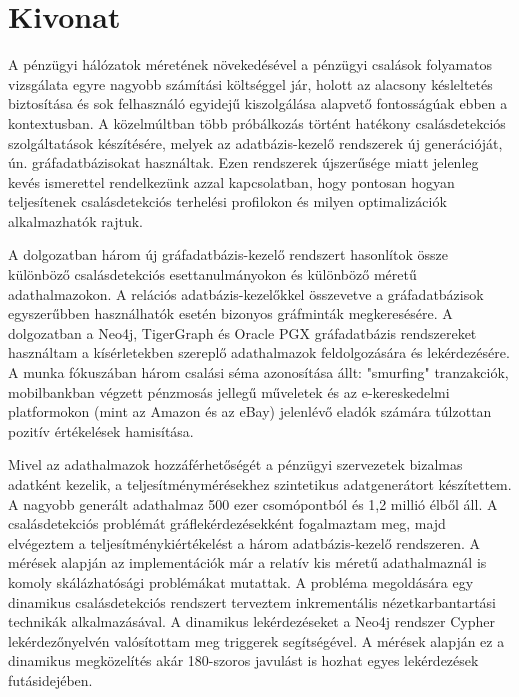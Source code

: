 \setcounter{page}{1}

\selecthungarian

\chapter*{Kivonat}

A pénzügyi hálózatok méretének növekedésével a pénzügyi csalások folyamatos vizsgálata egyre nagyobb számítási költséggel jár, holott az alacsony késleltetés biztosítása és sok felhasználó egyidejű kiszolgálása alapvető fontosságúak ebben a kontextusban.
A közelmúltban több próbálkozás történt hatékony csalásdetekciós szolgáltatások készítésére, melyek az adatbázis-kezelő rendszerek új generációját, ún. gráfadatbázisokat használtak.
Ezen rendszerek újszerűsége miatt jelenleg kevés ismerettel rendelkezünk azzal kapcsolatban, hogy pontosan hogyan teljesítenek csalásdetekciós terhelési profilokon és milyen optimalizációk alkalmazhatók rajtuk.

A dolgozatban három új gráfadatbázis-kezelő rendszert hasonlítok össze különböző csalásdetekciós esettanulmányokon és különböző méretű adathalmazokon.
A relációs adatbázis-kezelőkkel összevetve a gráfadatbázisok egyszerűbben használhatók esetén bizonyos gráfminták megkeresésére.
A dolgozatban a Neo4j, TigerGraph és Oracle PGX gráfadatbázis rendszereket használtam a kísérletekben szereplő adathalmazok feldolgozására és lekérdezésére.
A munka fókuszában három csalási séma azonosítása állt:
"smurfing" tranzakciók,
mobilbankban végzett pénzmosás jellegű műveletek és
az e-kereskedelmi platformokon (mint az Amazon és az eBay) jelenlévő eladók számára túlzottan pozitív értékelések hamisítása.

Mivel az adathalmazok hozzáférhetőségét a pénzügyi szervezetek bizalmas adatként kezelik, a teljesítménymérésekhez szintetikus adatgenerátort készítettem.
A nagyobb generált adathalmaz 500 ezer csomópontból és 1,2 millió élből áll.
A csalásdetekciós problémát gráflekérdezésekként fogalmaztam meg, majd elvégeztem a teljesítménykiértékelést a három adatbázis-kezelő rendszeren. A mérések alapján az implementációk már a relatív kis méretű adathalmaznál is komoly skálázhatósági problémákat mutattak.
A probléma megoldására egy dinamikus csalásdetekciós rendszert terveztem inkrementális nézetkarbantartási technikák alkalmazásával.
A dinamikus lekérdezéseket a Neo4j rendszer Cypher lekérdezőnyelvén valósítottam meg triggerek segítségével. A mérések alapján ez a dinamikus megközelítés akár 180-szoros javulást is hozhat egyes lekérdezések futásidejében.




